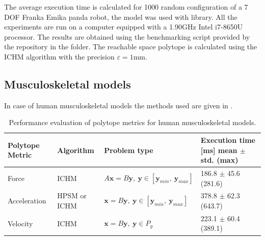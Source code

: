 
The average execution time is calculated for 1000 random configuration of a 7 DOF Franka Emika panda robot, the model was used with  \cite{pinocchio2021} library. All the experiments are run on a computer equipped with a 1.90GHz Intel i7-8650U processor. The results are obtained using the benchmarking script provided by the repository in the  folder.  The reachable space polytope is calculated using the ICHM algorithm with the precision $\varepsilon=1$mm. 

\subsection{Musculoskeletal models}

In case of human musculoskeletal models the methods used are given in .
\begin{table}[h]
\centering
\begin{tabular}{|l|l|l|l|}
\hline
Polytope Metric & Algorithm & Problem type & \makecell[c]{Execution time [ms] \\ mean $\pm$ std. (max)} \\
\hline
Force & ICHM & $A\bm{x}=B\bm{y},~ \bm{y} \in [\bm{y}_{min}, ~\bm{y}_{max}]$ & 186.8 $\pm$ 45.6 (281.6) \\
Acceleration & HPSM or ICHM & $\bm{x}=B\bm{y},~ \bm{y} \in [\bm{y}_{min}, ~\bm{y}_{max}]$ & 378.8 $\pm$ 62.3 (643.7) \\
Velocity & ICHM & $\bm{x}=B\bm{y},~ \bm{y} \in P_{y}$ & 223.1 $\pm$ 60.4 (389.1) \\
\hline
\end{tabular}
\caption{Performance evaluation of polytope metrics for human musculoskeletal models.}
\label{tab:methods_humans}
\end{table}


